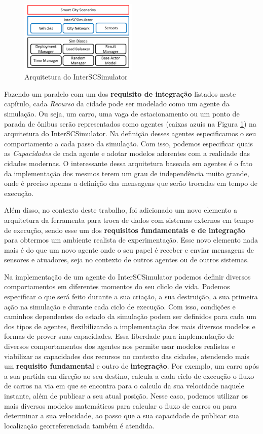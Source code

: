 \begin{figure}[ht]
	\centering
	\includegraphics[width=0.5\textwidth]{figuras/Arquitetura.pdf}
	\caption{Arquitetura do InterSCSimulator}
	\label{fig:simulator_architecture}
\end{figure}

Fazendo um paralelo com um dos \textbf{requisito de integração} listados neste capítulo, cada \textit{Recurso} da cidade pode ser modelado como um agente da simulação.
Ou seja, um carro, uma vaga de estacionamento ou um ponto de parada de ônibus serão representados como agentes (caixas azuis na Figura \ref{fig:simulator_architecture})
na arquitetura do InterSCSimulator.
Na definição desses agentes especificamos o seu comportamento a cada passo da simulação.
Com isso, podemos especificar quais as \textit{Capacidades} de cada agente e adotar modelos aderentes com a realidade das cidades modernas.
O interessante dessa arquitetura baseada em agentes é o fato da implementação dos mesmos terem um grau de independência muito grande, onde é preciso apenas a definição
das mensagens que serão trocadas em tempo de execução.

Além disso, no contexto deste trabalho, foi adicionado um novo elemento a arquitetura da ferramenta para troca de dados com sistemas externos em tempo de execução,
sendo esse um dos \textbf{requisitos fundamentais e de integração} para obtermos um ambiente realista de experimentação.
Esse novo elemento nada mais é do que um novo agente onde o seu papel é receber e enviar mensagens de sensores e atuadores, seja no contexto de outros agentes ou de
outros sistemas.

Na implementação de um agente do InterSCSimulator podemos definir diversos comportamentos em diferentes momentos do seu cliclo de vida.
Podemos especificar o que será feito durante a sua criação, a sua destruição, a sua primeira ação na simulação e durante cada ciclo de execução.
Com isso, condições e caminhos dependentes do estado da simulação podem ser definidos para cada um dos tipos de agentes, flexibilizando a implementação dos
mais diversos modelos e formas de prover suas capacidades.
Essa liberdade para implementação de diversos comportamentos dos agentes nos permite usar modelos realistas e viabilizar as capacidades dos recursos no contexto das cidades,
atendendo mais um \textbf{requisito fundamental} e outro de \textbf{integração}.
Por exemplo, um carro após a sua partida em direção ao seu destino, calcula a cada ciclo de execução o fluxo de carros na via em que se encontra para o calculo da
sua velocidade naquele instante, além de publicar a seu atual posição.
Nesse caso, podemos utilizar os mais diversos modelos matemáticos para calcular o fluxo de carros ou para determinar a sua velocidade, ao passo que a sua capacidade
de publicar sua localização georreferenciada também é atendida.

